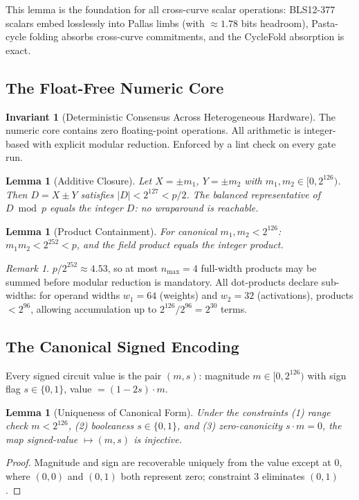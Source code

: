 \documentclass[11pt, a4paper]{article}
\theoremstyle{plain}
\newtheorem{lemma}[theorem]{Lemma}
\theoremstyle{definition}
\newtheorem{invariant}{Invariant}
\theoremstyle{remark}
\newtheorem{remark}{Remark}
\begin{document}
This lemma is the foundation for all cross-curve scalar operations:
BLS12-377 scalars embed losslessly into Pallas limbs (with
 $\approx 1.78$ bits headroom), Pasta-cycle folding absorbs cross-curve
commitments, and the CycleFold absorption is exact.

\subsection{The Float-Free Numeric Core}

\begin{invariant}[Deterministic Consensus Across Heterogeneous Hardware]
The numeric core contains zero floating-point operations. All arithmetic
is integer-based with explicit modular reduction. Enforced by a lint
check on every gate run.
\end{invariant}

\begin{lemma}[Additive Closure]
Let $X = \pm m_1$, $Y = \pm m_2$ with $m_1, m_2 \in [0, 2^{126})$.
Then $D = X \pm Y$ satisfies $|D| < 2^{127} < p/2$.
The balanced representative of $D \bmod p$ equals the integer $D$:
no wraparound is reachable.
\end{lemma}

\begin{lemma}[Product Containment]
For canonical $m_1, m_2 < 2^{126}$: $m_1 m_2 < 2^{252} < p$, and the
field product equals the integer product.
\end{lemma}

\begin{remark}
 $p / 2^{252} \approx 4.53$, so at most $n_{\max} = 4$ full-width
products may be summed before modular reduction is mandatory. All
dot-products declare sub-widths: for operand widths $w_1 = 64$ (weights)
and $w_2 = 32$ (activations), products $< 2^{96}$, allowing accumulation
up to $2^{126}/2^{96} = 2^{30}$ terms.
\end{remark}

\subsection{The Canonical Signed Encoding}

Every signed circuit value is the pair $(m, s)$: magnitude
 $m \in [0, 2^{126})$ with sign flag $s \in \{0,1\}$, value $= (1-2s) \cdot m$.

\begin{lemma}[Uniqueness of Canonical Form]
Under the constraints (1) range check $m < 2^{126}$, (2) booleaness
 $s \in \{0,1\}$, and (3) zero-canonicity $s \cdot m = 0$, the map
signed-value $\mapsto (m,s)$ is injective.
\end{lemma}
\begin{proof}
Magnitude and sign are recoverable uniquely from the value except at
 $0$, where $(0,0)$ and $(0,1)$ both represent zero; constraint 3
eliminates $(0,1)$.
\end{proof}
\end{document}
